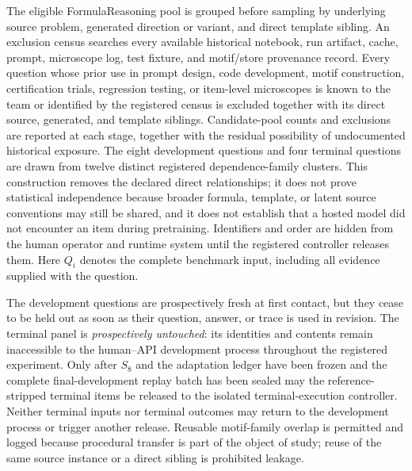 \documentclass[10pt]{article} %
\providecommand{\1}{\mathbf{1}}  %
\theoremstyle{remark}
\theoremstyle{definition}
\begin{document}
The eligible FormulaReasoning pool is grouped before sampling by underlying source problem, generated direction or variant, and direct template sibling. An exclusion census searches every available historical notebook, run artifact, cache, prompt, microscope log, test fixture, and motif/store provenance record. Every question whose prior use in prompt design, code development, motif construction, certification trials, regression testing, or item-level microscopes is known to the team or identified by the registered census is excluded together with its direct source, generated, and template siblings. Candidate-pool counts and exclusions are reported at each stage, together with the residual possibility of undocumented historical exposure. The eight development questions and four terminal questions are drawn from twelve distinct registered dependence-family clusters. This construction removes the declared direct relationships; it does not prove statistical independence because broader formula, template, or latent source conventions may still be shared, and it does not establish that a hosted model did not encounter an item during pretraining. Identifiers and order are hidden from the human operator and runtime system until the registered controller releases them. Here $Q_i$ denotes the complete benchmark input, including all evidence supplied with the question.

The development questions are prospectively fresh at first contact, but they cease to be held out as soon as their question, answer, or trace is used in revision. The terminal panel is \emph{prospectively untouched}: its identities and contents remain inaccessible to the human--API development process throughout the registered experiment. Only after $S_8$ and the adaptation ledger have been frozen and the complete final-development replay batch has been sealed may the reference-stripped terminal items be released to the isolated terminal-execution controller. Neither terminal inputs nor terminal outcomes may return to the development process or trigger another release. Reusable motif-family overlap is permitted and logged because procedural transfer is part of the object of study; reuse of the same source instance or a direct sibling is prohibited leakage.
\end{document}
